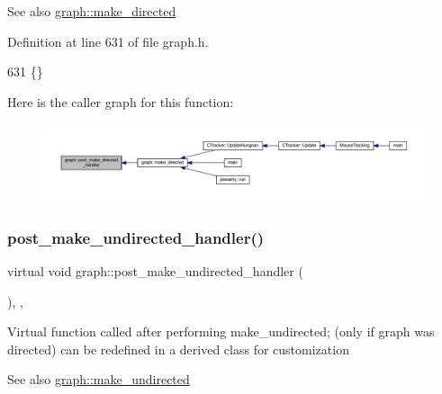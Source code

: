 \begin{DoxySeeAlso}{See also}
\mbox{\hyperlink{classgraph_a1615678dee6248d6d8a00c553770b3bd}{graph\+::make\+\_\+directed}} 
\end{DoxySeeAlso}


Definition at line 631 of file graph.\+h.


\begin{DoxyCode}
631 \{\}
\end{DoxyCode}
Here is the caller graph for this function\+:
\nopagebreak
\begin{figure}[H]
\begin{center}
\leavevmode
\includegraphics[width=350pt]{classgraph_a43dc35def3d8125eb8f3841d55e0b1c8_icgraph}
\end{center}
\end{figure}
\mbox{\label{classgraph_a3d2bc348d12931aff1d2e97a6b4285c3}} 
\subsubsection{\texorpdfstring{post\+\_\+make\+\_\+undirected\+\_\+handler()}{post\_make\_undirected\_handler()}}
{\footnotesize\ttfamily virtual void graph\+::post\+\_\+make\+\_\+undirected\+\_\+handler (\begin{DoxyParamCaption}{ }\end{DoxyParamCaption})\hspace{0.3cm}{\ttfamily [inline]}, {\ttfamily [virtual]}, {\ttfamily [inherited]}}

Virtual function called after performing make\+\_\+undirected; (only if graph was directed) can be redefined in a derived class for customization

\begin{DoxySeeAlso}{See also}
\mbox{\hyperlink{classgraph_a31c8b895bd842f1b9dcc67649956cfc7}{graph\+::make\+\_\+undirected}} 
\end{DoxySeeAlso}


